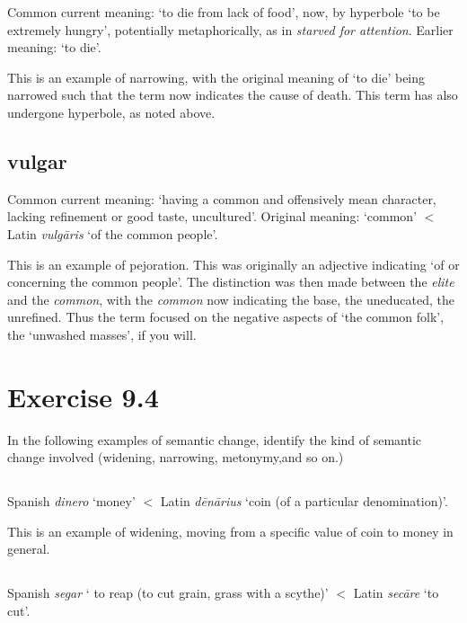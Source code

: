 \documentclass[12pt]{article}
\begin{document}
Common current meaning: `to die from lack of food', now, by hyperbole `to be extremely hungry', potentially metaphorically, as in {\it starved for attention}.
Earlier meaning: `to die'.

This is an example of narrowing, with the original meaning of `to die' being narrowed such that the term now indicates the cause of death. This term has also undergone hyperbole, as noted above.

\subsection{vulgar}

Common current meaning: `having a common and offensively mean character, lacking refinement or good taste, uncultured'. Original meaning: `common' $<$ Latin {\it vulg\=aris} `of the common people'.

This is an example of pejoration. This was originally an adjective indicating `of or concerning the common people'. The distinction was then made between the {\it elite} and the {\it common}, with the {\it common} now indicating the base, the uneducated, the unrefined. Thus the term focused on the negative aspects of `the common folk', the `unwashed masses', if you will.

\section{Exercise 9.4}

In the following examples of semantic change, identify the kind of semantic change involved (widening, narrowing, metonymy,and so on.)

\addtocounter{subsection}{+1}
\subsection{}

Spanish {\it dinero} `money' $<$ Latin {\it d\=en\=arius} `coin (of a particular denomination)'.

This is an example of widening, moving from a specific value of coin to money in general.

\addtocounter{subsection}{+1}
\subsection{}

Spanish {\it segar} ` to reap (to cut grain, grass with a scythe)' $<$ Latin {\it sec\=are} `to cut'.
\end{document}
